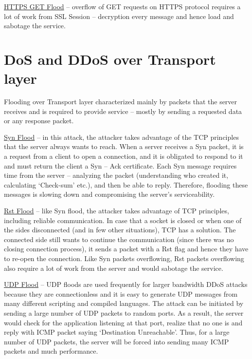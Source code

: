 \documentclass{report}
\begin{document}
 \hfill \break \underline{HTTPS GET Flood} – overflow of GET requests on HTTPS protocol requires a lot of work from SSL Session – decryption every message and hence load and sabotage the service.

\section {DoS and DDoS over Transport layer} 

 \hfill \break Flooding over Transport layer characterized mainly by packets that the server receives and is required to provide service – mostly by sending a requested data or any response packet.

 \hfill \break \underline{Syn Flood} – in this attack, the attacker takes advantage of the TCP principles that the server always wants to reach. When a server receives a Syn packet, it is a request from a client to open a connection, and it is obligated to respond to it and must return the client a Syn – Ack certificate. Each Syn message requires time from the server – analyzing the packet (understanding who created it, calculating ‘Check-sum’ etc.), and then be able to reply. Therefore, flooding these messages is slowing down and compromising the server’s serviceability.

 \hfill \break \underline{Rst Flood} – like Syn flood, the attacker takes advantage of TCP principles, including reliable communication. In case that a socket is closed or when one of the sides disconnected (and in few other situations), TCP has a solution. The connected side still wants to continue the communication (since there was no closing connection process), it sends a packet with a Rst flag and hence they have to re-open the connection. Like Syn packets overflowing, Rst packets overflowing also require a lot of work from the server and would sabotage the service.

 \hfill \break \underline{UDP Flood} – UDP floods are used frequently for larger bandwidth DDoS attacks because they are connectionless and it is easy to generate UDP messages from many different scripting and compiled languages. The attack can be initiated by sending a large number of UDP packets to random ports. As a result, the server would check for the application listening at that port, realize that no one is and reply with ICMP packet saying ‘Destination Unreachable’. Thus, for a large number of UDP packets, the server will be forced into sending many ICMP packets and much performance.
\end{document}
